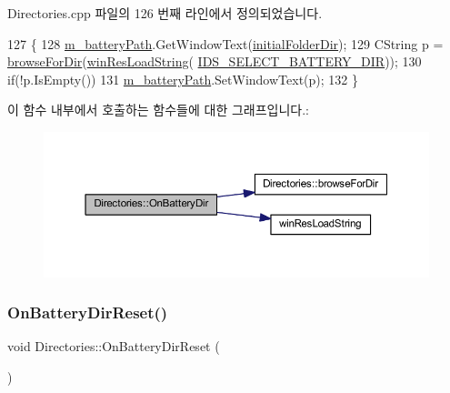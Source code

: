 Directories.\+cpp 파일의 126 번째 라인에서 정의되었습니다.


\begin{DoxyCode}
127 \{
128   \mbox{\hyperlink{class_directories_af8f18fc9d1fbcd0df0cba4ec6fb862de}{m\_batteryPath}}.GetWindowText(\mbox{\hyperlink{class_directories_a5f307fd959af44c194c520b5452cafba}{initialFolderDir}});
129   CString p = \mbox{\hyperlink{class_directories_a7e24bf265fe6af9c01e0939952c337e1}{browseForDir}}(\mbox{\hyperlink{_win_res_util_8cpp_a416e85e80ab9b01376e87251c83d1a5a}{winResLoadString}}(
      \mbox{\hyperlink{resource_8h_a2e8b46b8948d02c82da5c3a914d66951}{IDS\_SELECT\_BATTERY\_DIR}}));
130   \textcolor{keywordflow}{if}(!p.IsEmpty())
131     \mbox{\hyperlink{class_directories_af8f18fc9d1fbcd0df0cba4ec6fb862de}{m\_batteryPath}}.SetWindowText(p);
132 \}
\end{DoxyCode}
이 함수 내부에서 호출하는 함수들에 대한 그래프입니다.\+:
\nopagebreak
\begin{figure}[H]
\begin{center}
\leavevmode
\includegraphics[width=350pt]{class_directories_a31c9021298d9f3a3ea1beabe73ab7685_cgraph}
\end{center}
\end{figure}
\mbox{\label{class_directories_a9479f79772b934344110acfccd64a064}} 
\subsubsection{\texorpdfstring{On\+Battery\+Dir\+Reset()}{OnBatteryDirReset()}}
{\footnotesize\ttfamily void Directories\+::\+On\+Battery\+Dir\+Reset (\begin{DoxyParamCaption}{ }\end{DoxyParamCaption})\hspace{0.3cm}{\ttfamily [protected]}}




